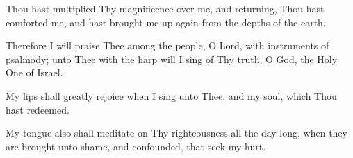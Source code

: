 Thou hast multiplied Thy magnificence over me, and returning, Thou hast comforted me, and hast brought me up again from the depths of the earth.

Therefore I will praise Thee among the people, O Lord, with instruments of psalmody; unto Thee with the harp will I sing of Thy truth, O God, the Holy One of Israel.

My lips shall greatly rejoice when I sing unto Thee, and my soul, which Thou hast redeemed.

My tongue also shall meditate on Thy righteousness all the day long, when they are brought unto shame, and confounded, that seek my hurt.
